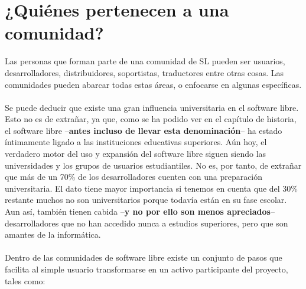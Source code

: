 \documentclass{book}
\begin{document}
\section{¿Quiénes pertenecen a una comunidad?}


Las personas que forman parte de una comunidad de SL pueden ser usuarios, desarrolladores, distribuidores, soportistas, traductores entre otras cosas. Las comunidades pueden abarcar todas estas áreas, o enfocarse en algunas específicas.
\\
\\
Se puede deducir que existe una gran influencia universitaria en el software libre. Esto no es de extrañar, ya que, como se ha podido ver en el capítulo de historia, el software libre –{\bf antes incluso de llevar esta denominación}– ha estado íntimamente ligado a las instituciones educativas superiores. Aún hoy, el verdadero motor del uso y expansión del software libre siguen siendo las universidades y los grupos de usuarios estudiantiles. No es, por tanto, de extrañar que más de un 70\% de los desarrolladores cuenten con una preparación universitaria. El dato tiene mayor importancia si tenemos en cuenta que del 30\% restante muchos no son universitarios porque todavía están en su fase escolar. Aun así, también tienen cabida –{\bf y no por ello son menos apreciados}– desarrolladores que no han accedido nunca a estudios superiores, pero que son amantes de la informática.
\\
\\
Dentro de las comunidades de software libre existe un conjunto de pasos que facilita al simple usuario transformarse en un activo participante del proyecto, tales como: 
\end{document}
